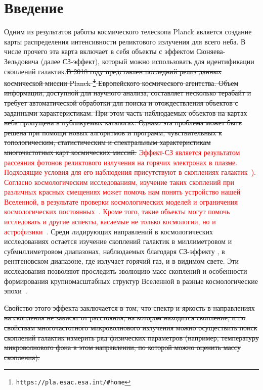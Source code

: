 \documentclass[
aps,%
12pt,%
final,%
notitlepage,%
oneside,%
onecolumn,%
nobibnotes,%
nofootinbib,%
superscriptaddress,%
noshowpacs,%
centertags]%
{revtex4}
\begin{document}
\section{Введение}
\label{sec:intro}

Одним из результатов работы космического телескопа Planck является создание карты распределения интенсивности реликтового излучения для всего неба. В числе прочего эта карта включает в себя объекты с эффектом Сюняева-Зельдовича (далее СЗ-эффект), который можно использовать для идентификации скоплений галактик.\sout{В 2018 году представлен последний релиз данных космической миссии Planck \footnote{\tt https://pla.esac.esa.int/#home} Европейского космического агентства. Объем информации, доступной для научного анализа, составляет несколько терабайт и требует автоматической обработки для поиска и отождествления объектов с \sout{заданными характеристикам}. При этом часть наблюдаемых объектов на картах неба пропущена в публикуемых каталогах. Однако эта проблема может быть решена при помощи новых алгоритмов и программ, чувствительных к топологическим, статистическим и спектральным характеристикам многочастотных карт космических миссий.}
\textcolor{red}{Эффект-СЗ является результатом рассеяния фотонов реликтового излучения на горячих электронах в плазме. Подходящие условия для его наблюдения присутствуют в скоплениях галактик~\cite{zs}). Согласно космологическим исследованиям, изучение таких скоплений при различных красных смещениях может помочь нам понять устройство нашей Вселенной, в результате проверки космологических моделей и ограничения космологических постоянных~\cite{Allen, Kravtsov, Nagai}. Кроме того, такие объекты могут помочь исследовать и другие аспекты, касаемые не только космологии, но и астрофизики~\cite{Sarazin, Kormendy, Bykov}.} 
Среди лидирующих направлений в космологических исследованиях остается изучение скоплений галактик в миллиметровом и субмиллиметровом диапазонах, наблюдаемых благодаря СЗ-эффекту \cite{zs}, в рентгеновском диапазоне, где излучает горячий газ, и в видимом свете. Эти исследования позволяют проследить эволюцию масс скоплений и особенности формирования крупномасштабных структур Вселенной в разные космологические эпохи\textcolor{red}{~\cite{Basu}}. 

\sout{Свойство этого эффекта заключается в том, что спектр и яркость в направлениях на скопления не зависят от расстояния, на котором находится скопление, и по свойствам многочастотного микроволнового излучения можно осуществить поиск скоплений галактик измерить ряд физических параметров (например, температуру микроволнового фона в этом направлении, по которой можно оценить массу скопления).} 
\end{document}

